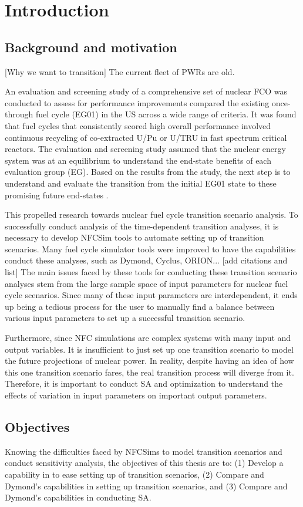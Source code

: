 \chapter[Introduction]{Introduction}

\section{Background and motivation}
[Why we want to transition]
The current fleet of \glspl{PWR} are old. 

An evaluation and screening study of a comprehensive set of nuclear 
\gls{FCO} \cite{wigeland_nuclear_2014} was conducted to assess 
for performance improvements compared the existing once-through 
fuel cycle (EG01) in the \gls{US} across a wide range of criteria. 
It was found that fuel cycles that consistently scored high 
overall performance involved continuous recycling
of co-extracted U/Pu or U/TRU in fast spectrum critical reactors. 
The evaluation and screening study assumed that 
the nuclear energy system was at an equilibrium to understand 
the end-state benefits of each evaluation group (EG). 
Based on the results from the study, the next step is 
to understand and evaluate the transition from the initial EG01
state to these promising future end-states 
\cite{feng_standardized_2016}. 

This propelled research towards nuclear fuel cycle transition 
scenario analysis. 
To successfully conduct analysis of the time-dependent transition
analyses, it is necessary to develop \gls{NFCSim} tools to  
automate setting up of transition scenarios. 
Many fuel cycle simulator tools were improved to have 
the capabilities conduct these analyses, such as 
Dymond, Cyclus, ORION... 
[add citations and list]  
The main issues faced by these tools for conducting these transition 
scenario analyses stem from the large sample space of input 
parameters for nuclear fuel cycle scenarios.
Since many of these input parameters are interdependent, it ends
up being a tedious process for the user to manually find a balance 
between various input parameters to set up a successful transition 
scenario. 

Furthermore, since \gls{NFC} simulations are complex systems with 
many input and output variables. 
It is insufficient to just set up one transition scenario to model 
the future projections of nuclear power. 
In reality, despite having an idea of how this one transition 
scenario fares, the real transition process will diverge from it. 
Therefore, it is important to conduct \gls{SA} and optimization 
to understand the effects of variation in input parameters on 
important output parameters. 

\section{Objectives}
Knowing the difficulties faced by \gls{NFCSim}s to model 
transition scenarios and conduct sensitivity analysis, 
the objectives of this thesis are to: 
(1) Develop a capability in \Cyclus to ease setting up of transition 
scenarios, 
(2) Compare \Cyclus and Dymond's capabilities in setting up 
transition scenarios, and 
(3) Compare \Cyclus and Dymond's capabilities in conducting \gls{SA}. 